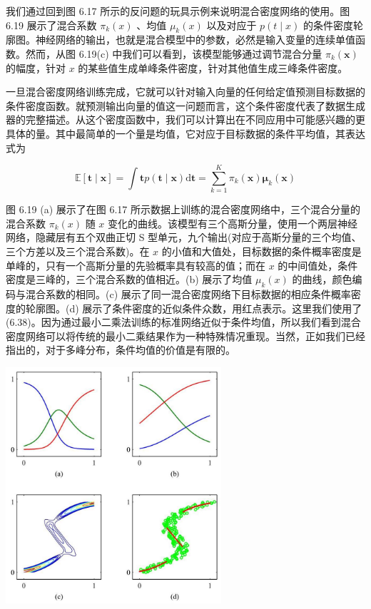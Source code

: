 \documentclass[10pt]{report}
\begin{document}
我们通过回到图 6.17 所示的反问题的玩具示例来说明混合密度网络的使用。图 6.19 展示了混合系数 \({\pi }_{k}\left( x\right)\) 、均值 \({\mu }_{k}\left( x\right)\) 以及对应于 \(p\left( {t \mid  x}\right)\) 的条件密度轮廓图。神经网络的输出，也就是混合模型中的参数，必然是输入变量的连续单值函数。然而，从图 6.19(c) 中我们可以看到，该模型能够通过调节混合分量 \({\pi }_{k}\left( \mathbf{x}\right)\) 的幅度，针对 \(x\) 的某些值生成单峰条件密度，针对其他值生成三峰条件密度。

一旦混合密度网络训练完成，它就可以针对输入向量的任何给定值预测目标数据的条件密度函数。就预测输出向量的值这一问题而言，这个条件密度代表了数据生成器的完整描述。从这个密度函数中，我们可以计算出在不同应用中可能感兴趣的更具体的量。其中最简单的一个量是均值，它对应于目标数据的条件平均值，其表达式为

\[
\mathbb{E}\left\lbrack  {\mathbf{t} \mid  \mathbf{x}}\right\rbrack   = \int \mathbf{t}p\left( {\mathbf{t} \mid  \mathbf{x}}\right) \mathrm{d}\mathbf{t} = \mathop{\sum }\limits_{{k = 1}}^{K}{\pi }_{k}\left( \mathbf{x}\right) {\mathbf{\mu }}_{k}\left( \mathbf{x}\right)  \tag{6.48}
\]

图 6.19 (a) 展示了在图 6.17 所示数据上训练的混合密度网络中，三个混合分量的混合系数 \({\pi }_{k}\left( x\right)\) 随 \(x\) 变化的曲线。该模型有三个高斯分量，使用一个两层神经网络，隐藏层有五个双曲正切 S 型单元，九个输出(对应于高斯分量的三个均值、三个方差以及三个混合系数)。在 \(x\) 的小值和大值处，目标数据的条件概率密度是单峰的，只有一个高斯分量的先验概率具有较高的值；而在 \(x\) 的中间值处，条件密度是三峰的，三个混合系数的值相近。(b) 展示了均值 \({\mu }_{k}\left( x\right)\) 的曲线，颜色编码与混合系数的相同。(c) 展示了同一混合密度网络下目标数据的相应条件概率密度的轮廓图。(d) 展示了条件密度的近似条件众数，用红点表示。这里我们使用了 (6.38)。因为通过最小二乘法训练的标准网络近似于条件均值，所以我们看到混合密度网络可以将传统的最小二乘结果作为一种特殊情况重现。当然，正如我们已经指出的，对于多峰分布，条件均值的价值是有限的。

\begin{center}
\includegraphics[max width=0.6\textwidth]{images/0194e279-9b28-703a-88f4-c3ac21e2010d_222_691_351_820_898_0.jpg}
\end{center}
\hspace*{3em} 
\end{document}
